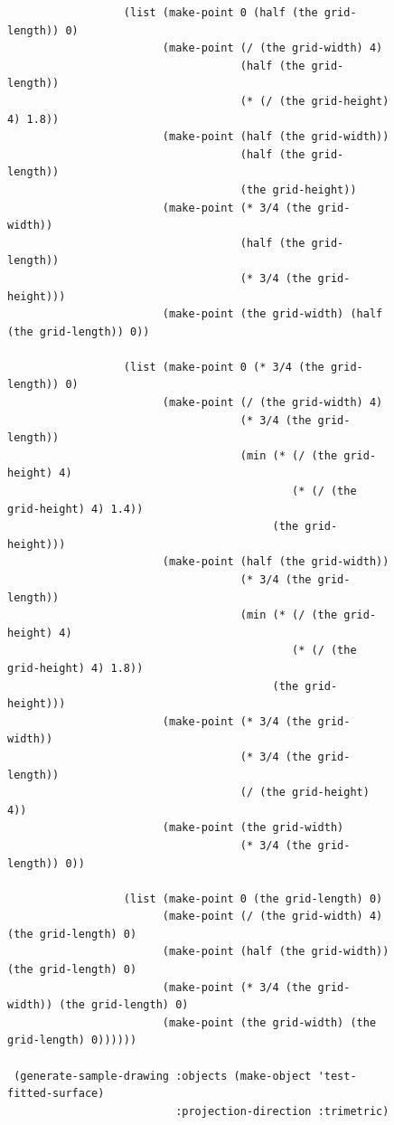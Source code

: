 \documentclass [11pt]{book}
\begin{document}
\begin{itemize}
\begin{figure}
\begin{lrbox}{\boxedverb}
\begin{minipage}{\linewidth}
{\begin{verbatim}
                  (list (make-point 0 (half (the grid-length)) 0)
                        (make-point (/ (the grid-width) 4) 
                                    (half (the grid-length)) 
                                    (* (/ (the grid-height) 4) 1.8))
                        (make-point (half (the grid-width)) 
                                    (half (the grid-length)) 
                                    (the grid-height))
                        (make-point (* 3/4 (the grid-width)) 
                                    (half (the grid-length)) 
                                    (* 3/4 (the grid-height)))
                        (make-point (the grid-width) (half (the grid-length)) 0))
                         
                  (list (make-point 0 (* 3/4 (the grid-length)) 0)
                        (make-point (/ (the grid-width) 4) 
                                    (* 3/4 (the grid-length)) 
                                    (min (* (/ (the grid-height) 4) 
                                            (* (/ (the grid-height) 4) 1.4)) 
                                         (the grid-height)))
                        (make-point (half (the grid-width)) 
                                    (* 3/4 (the grid-length)) 
                                    (min (* (/ (the grid-height) 4) 
                                            (* (/ (the grid-height) 4) 1.8)) 
                                         (the grid-height)))
                        (make-point (* 3/4 (the grid-width)) 
                                    (* 3/4 (the grid-length)) 
                                    (/ (the grid-height) 4))
                        (make-point (the grid-width) 
                                    (* 3/4 (the grid-length)) 0))
                         
                  (list (make-point 0 (the grid-length) 0)
                        (make-point (/ (the grid-width) 4) (the grid-length) 0)
                        (make-point (half (the grid-width)) (the grid-length) 0)
                        (make-point (* 3/4 (the grid-width)) (the grid-length) 0)
                        (make-point (the grid-width) (the grid-length) 0))))))

 (generate-sample-drawing :objects (make-object 'test-fitted-surface)
                          :projection-direction :trimetric)


 
\end{verbatim}}
\end{minipage}
\end{lrbox}
\fbox{\usebox{\boxedverb}}


\end{figure}
\end{itemize}
\end{document}
